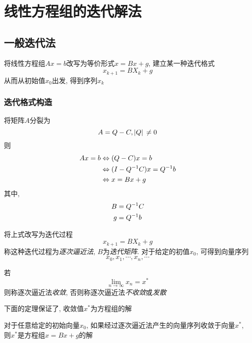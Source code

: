 \chapter{线性方程组的迭代解法}
\section{一般迭代法}

将线性方程组$Ax=b$改写为等价形式$x=Bx+g$, 建立某一种迭代格式
\begin{equation*}
    x_{k+1}=BX_k+g
\end{equation*}
从而从初始值$x_0$出发, 得到序列${x_k}$

\subsection{迭代格式构造}

将矩阵$A$分裂为
\begin{equation*}
    A=Q-C, \abs*{Q}\ne 0
\end{equation*}
则
\begin{align*}
    Ax=b&\Leftrightarrow(Q-C)x=b\\
    &\Leftrightarrow(I-Q^{-1}C)x=Q^{-1}b\\
    &\Leftrightarrow x=Bx+g
\end{align*}
其中,
\begin{align*}
    B&=Q^{-1}C\\
    g&=Q^{-1}b
\end{align*}

将上式改写为迭代过程
\begin{equation*}
    x_{k+1}=BX_k+g
\end{equation*}
称这种迭代过程为\emph{逐次逼近法}, $B$为\emph{迭代矩阵}. 对于给定的初值$x_0$, 可得到向量序列
\begin{equation*}
    x_0,x_1,\cdots,x_n,\cdots
\end{equation*}

\begin{definition}
    若
    \begin{equation*}
        \lim\limits_{n\to\infty}x_n=x^*
    \end{equation*}
    则称逐次逼近法\emph{收敛}, 否则称逐次逼近法\emph{不收敛}或\emph{发散}
\end{definition}

下面的定理保证了, 收敛值$x^*$为方程组的解
\begin{theorem}
    对于任意给定的初始向量$x_0$, 如果经过逐次逼近法产生的向量序列收敛于向量$x^*$, 则$x^*$是方程组$x=Bx+g$的解
\end{theorem}

